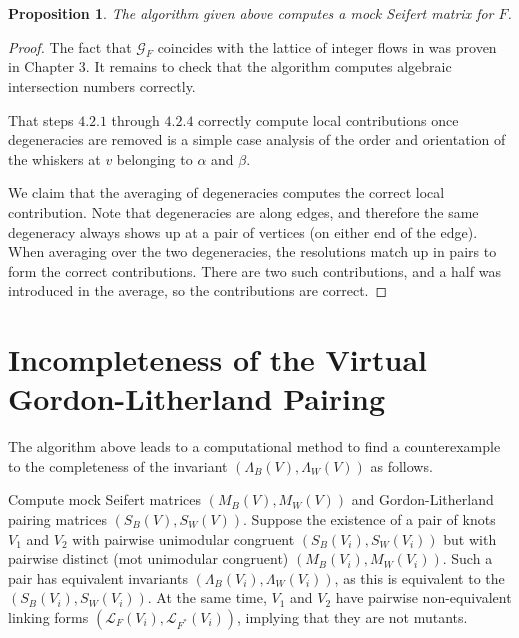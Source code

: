 \documentclass[12pt]{report}
\newtheorem*{proposition}{Proposition}
\theoremstyle{upright}
\begin{document}
\begin{proposition}
The algorithm given above computes a mock Seifert matrix for $F$.
\end{proposition}

\begin{proof}
The fact that $\mathcal{G}_{F}$ coincides with the lattice of integer flows in was proven in Chapter 3. It remains to check that the algorithm computes algebraic intersection numbers correctly.

That steps $4.2.1$ through $4.2.4$ correctly compute local contributions once degeneracies are removed is a simple case analysis of the order and orientation of the whiskers at $v$ belonging to $\alpha$ and $\beta$.

We claim that the averaging of degeneracies computes the correct local contribution. Note that degeneracies are along edges, and therefore the same degeneracy always shows up at a pair of vertices (on either end of the edge). When averaging over the two degeneracies, the resolutions match up in pairs to form the correct contributions. There are two such contributions, and a half was introduced in the average, so the contributions are correct.
\end{proof}

\section{Incompleteness of the Virtual Gordon-Litherland Pairing}

The algorithm above leads to a computational method to find a counterexample to the completeness of the invariant $(\Lambda_{B}(V), \Lambda_{W}(V))$ as follows.

Compute mock Seifert matrices $(M_{B}(V), M_{W}(V))$ and Gordon-Litherland pairing matrices $(S_{B}(V), S_{W}(V))$. Suppose the existence of a pair of knots $V_{1}$ and $V_{2}$ with pairwise unimodular congruent $(S_{B}(V_{i}), S_{W}(V_{i}))$ but with pairwise distinct (mot unimodular congruent) $(M_{B}(V_{i}), M_{W}(V_{i}))$. Such a pair has equivalent invariants $(\Lambda_{B}(V_{i}), \Lambda_{W}(V_{i}))$, as this is equivalent to the $(S_{B}(V_{i}), S_{W}(V_{i}))$. At the same time, $V_{1}$ and $V_{2}$ have pairwise non-equivalent linking forms $(\mathcal{L}_{F}(V_{i}), \mathcal{L}_{F^{*}}(V_{i}))$, implying that they are not mutants.
\end{document}
